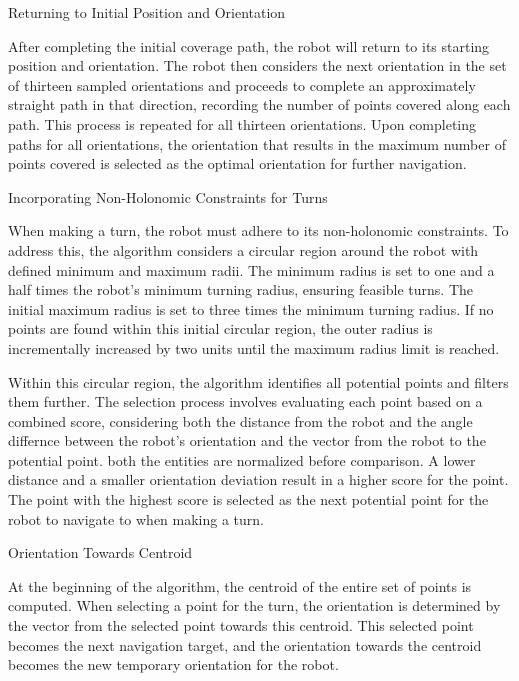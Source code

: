 \vspace*{6mm}  

Returning to Initial Position and Orientation

After completing the initial coverage path, the robot will return to its starting position and orientation. The robot then considers the next orientation in the set of thirteen sampled orientations and proceeds to complete an approximately straight path in that direction, recording the number of points covered along each path. This process is repeated for all thirteen orientations. Upon completing paths for all orientations, the orientation that results in the maximum number of points covered is selected as the optimal orientation for further navigation.
\vspace*{6mm}  

Incorporating Non-Holonomic Constraints for Turns
\vspace*{6mm}  

When making a turn, the robot must adhere to its non-holonomic constraints. To address this, the algorithm considers a circular region around the robot with defined minimum and maximum radii. The minimum radius is set to one and a half times the robot's minimum turning radius, ensuring feasible turns. The initial maximum radius is set to three times the minimum turning radius. If no points are found within this initial circular region, the outer radius is incrementally increased by two units until the maximum radius limit is reached.
\vspace*{6mm}  

Within this circular region, the algorithm identifies all potential points and filters them further. The selection process involves evaluating each point based on a combined score, considering both the distance from the robot and the angle differnce between the robot's orientation and the vector from the robot to the potential point. both the entities are normalized before comparison. A lower distance and a smaller orientation deviation result in a higher score for the point. The point with the highest score is selected as the next potential point for the robot to navigate to when making a turn.
\vspace*{6mm}  

Orientation Towards Centroid

At the beginning of the algorithm, the centroid of the entire set of points is computed. When selecting a point for the turn, the orientation is determined by the vector from the selected point towards this centroid. This selected point becomes the next navigation target, and the orientation towards the centroid becomes the new temporary orientation for the robot.

